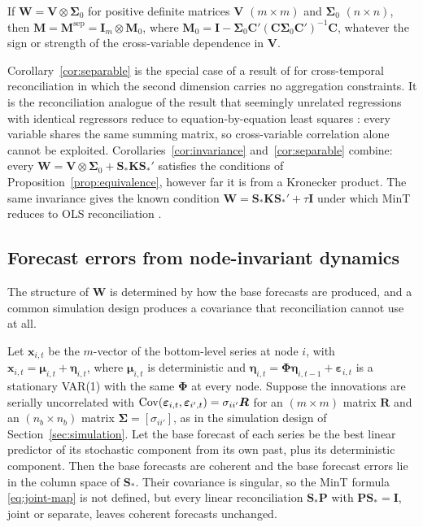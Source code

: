 \begin{corollary}[Separability]\label{cor:separable}
If $\bm{W} = \bm{V} \otimes \bm{\Sigma}_0$ for positive definite matrices $\bm{V}$ $(m \times m)$ and $\bm{\Sigma}_0$ $(n \times n)$, then $\bm{M} = \bm{M}^{\mathrm{sep}} = \bm{I}_m \otimes \bm{M}_0$, where $\bm{M}_0 = \bm{I} - \bm{\Sigma}_0\bm{C}'(\bm{C}\bm{\Sigma}_0\bm{C}')^{-1}\bm{C}$, whatever the sign or strength of the cross-variable dependence in $\bm{V}$.
\end{corollary}

Corollary~\ref{cor:separable} is the special case of a result of \citet{girolimetto2025cross} for cross-temporal reconciliation in which the second dimension carries no aggregation constraints. It is the reconciliation analogue of the result that seemingly unrelated regressions with identical regressors reduce to equation-by-equation least squares \citep{zellner1962efficient}: every variable shares the same summing matrix, so cross-variable correlation alone cannot be exploited. Corollaries~\ref{cor:invariance} and~\ref{cor:separable} combine: every $\bm{W} = \bm{V}\otimes\bm{\Sigma}_0 + \bm{S}_*\bm{K}\bm{S}_*'$ satisfies the conditions of Proposition~\ref{prop:equivalence}, however far it is from a Kronecker product. The same invariance gives the known condition $\bm{W} = \bm{S}_*\bm{K}\bm{S}_*' + \tau\bm{I}$ under which MinT reduces to OLS reconciliation \citep{hyndman2011optimal,wickramasuriya2021properties}.

\subsection{Forecast errors from node-invariant dynamics}

The structure of $\bm{W}$ is determined by how the base forecasts are produced, and a common simulation design produces a covariance that reconciliation cannot use at all.

\begin{proposition}\label{prop:coherent}
Let $\bm{x}_{i,t}$ be the $m$-vector of the bottom-level series at node $i$, with $\bm{x}_{i,t} = \bm{\mu}_{i,t} + \bm{\eta}_{i,t}$, where $\bm{\mu}_{i,t}$ is deterministic and $\bm{\eta}_{i,t} = \bm{\Phi}\bm{\eta}_{i,t-1} + \bm{\varepsilon}_{i,t}$ is a stationary VAR(1) with the same $\bm{\Phi}$ at every node. Suppose the innovations are serially uncorrelated with $\operatorname{Cov}(\bm{\varepsilon}_{i,t}, \bm{\varepsilon}_{i',t}) = \sigma_{ii'}\bm{R}$ for an $(m \times m)$ matrix $\bm{R}$ and an $(n_b \times n_b)$ matrix $\bm{\Sigma} = [\sigma_{ii'}]$, as in the simulation design of Section~\ref{sec:simulation}. Let the base forecast of each series be the best linear predictor of its stochastic component from its own past, plus its deterministic component. Then the base forecasts are coherent and the base forecast errors lie in the column space of $\bm{S}_*$. Their covariance is singular, so the MinT formula \eqref{eq:joint-map} is not defined, but every linear reconciliation $\bm{S}_*\bm{P}$ with $\bm{P}\bm{S}_* = \bm{I}$, joint or separate, leaves coherent forecasts unchanged.
\end{proposition}

